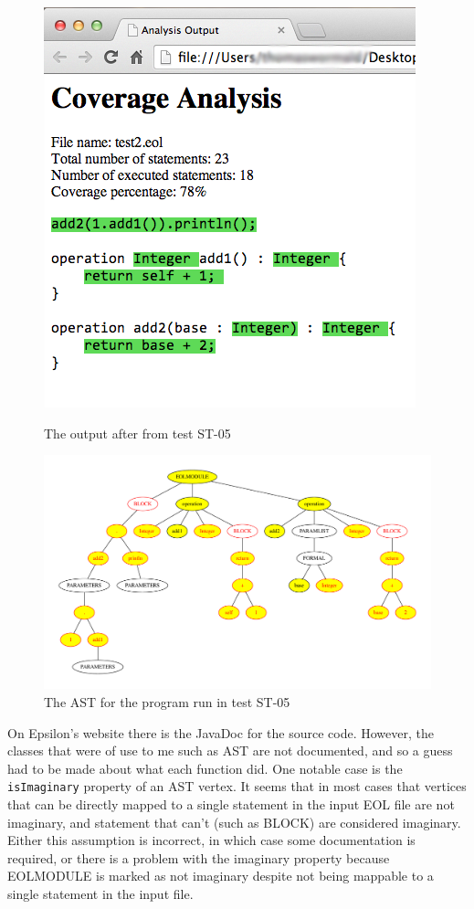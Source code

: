 \begin{figure}
\centering
\begin{minipage}[b]{.44\textwidth}
  \centering
  \includegraphics[width=0.6\linewidth]{figures/ST05HTML.png}
  \caption{The output after from test ST-05\\}
  \label{fig:ST05HTML}
\end{minipage}%
\begin{minipage}[b]{.1\textwidth}
\hspace{3.00mm}
\end{minipage}
\begin{minipage}[b]{.44\textwidth}
  \centering
  \includegraphics[width=\linewidth]{figures/ST05AST.pdf}
  \caption{The AST for the program run in test ST-05}
  \label{fig:ST05AST}
\end{minipage}
\end{figure}

On Epsilon's website \citep{epsilonWebsite} there is the JavaDoc for the source code. However, the classes that were of use to me such as AST are not documented, and so a guess had to be made about what each function did. One notable case is the \verb|isImaginary| property of an AST vertex. It seems that in most cases that vertices that can be directly mapped to a single statement in the input EOL file are not imaginary, and statement that can't (such as BLOCK) are considered imaginary. Either this assumption is incorrect, in which case some documentation is required, or there is a problem with the imaginary property because EOLMODULE is marked as not imaginary despite not being mappable to a single statement in the input file.

